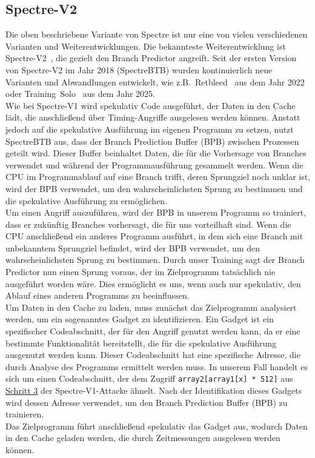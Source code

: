 \subsection{Spectre-V2}
\label{subsec:spectre_spectre-v2}
Die oben beschriebene Variante von Spectre ist nur eine von vielen verschiedenen Varianten und Weiterentwicklungen.
Die bekannteste Weiterentwicklung ist Spectre-V2~\cite{spec_v2}, die gezielt den Branch Predictor angreift.
Seit der ersten Version von Spectre-V2 im Jahr 2018 (SpectreBTB) wurden kontinuierlich neue Varianten und Abwandlungen entwickelt, wie z.B.~Retbleed~\cite{spec_v2_retbleed} aus dem Jahr 2022 oder Training~Solo~\cite{training_solo} aus dem Jahr 2025. \\
Wie bei Spectre-V1 wird spekulativ Code ausgeführt, der Daten in den Cache lädt, die anschließend über Timing-Angriffe ausgelesen werden können.
Anstatt jedoch auf die spekulative Ausführung im eigenen Programm zu setzen, nutzt SpectreBTB aus, dass der Branch Prediction Buffer (BPB) zwischen Prozessen geteilt wird.
Dieser Buffer beinhaltet Daten, die für die Vorhersage von Branches verwendet und während der Programmausführung gesammelt werden.
Wenn die CPU im Programmablauf auf eine Branch trifft, deren Sprungziel noch unklar ist, wird der BPB verwendet, um den wahrscheinlichsten Sprung zu bestimmen und die spekulative Ausführung zu ermöglichen. \\
Um einen Angriff auszuführen, wird der BPB in unserem Programm so trainiert, dass er zukünftig Branches vorhersagt, die für uns vorteilhaft sind.
Wenn die CPU anschließend ein anderes Programm ausführt, in dem sich eine Branch mit unbekanntem Sprungziel befindet, wird der BPB verwendet, um den wahrscheinlichsten Sprung zu bestimmen.
Durch unser Training sagt der Branch Predictor nun einen Sprung voraus, der im Zielprogramm tatsächlich nie ausgeführt worden wäre.
Dies ermöglicht es uns, wenn auch nur spekulativ, den Ablauf eines anderen Programms zu beeinflussen. \\
Um Daten in den Cache zu laden, muss zunächst das Zielprogramm analysiert werden, um ein sogenanntes Gadget zu identifizieren.
Ein Gadget ist ein spezifischer Codeabschnitt, der für den Angriff genutzt werden kann, da er eine bestimmte Funktionalität bereitstellt, die für die spekulative Ausführung ausgenutzt werden kann.
Dieser Codeabschnitt hat eine spezifische Adresse, die durch Analyse des Programms ermittelt werden muss.
In unserem Fall handelt es sich um einen Codeabschnitt, der dem Zugriff \texttt{array2[array1[x] * 512]} aus \hyperref[itm:spectre_step3_code]{\underline{Schritt 3}} der Spectre-V1-Attacke ähnelt.
Nach der Identifikation dieses Gadgets wird dessen Adresse verwendet, um den Branch Prediction Buffer (BPB) zu trainieren. \\
Das Zielprogramm führt anschließend spekulativ das Gadget aus, wodurch Daten in den Cache geladen werden, die durch Zeitmessungen ausgelesen werden können.

